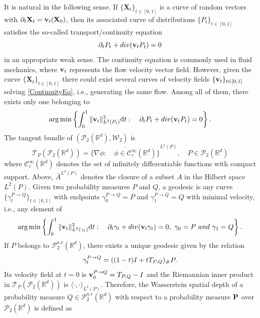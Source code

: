 \documentclass{imsart}
\numberwithin{equation}{section}
\def\R{\mathbb{R}}
\def\X{\mathbf{X}}
\DeclareMathOperator*{\argmin}{arg\,min}
\begin{document}
It is natural in the following sense. If $\{\X_t\}_{t\in [0,1]}$ is a curve of random vectors with $\partial_t \X_t={\bf v}_t(\X_0)$,  then its associated curve of distributions $\{P_t\}_{t\in [0,1]}$ satisfies the so-called transport/continuity equation 
\begin{equation}
	\label{ContinuityEq}
	\partial_t P_t+{\rm div}( {\bf v}_t P_t )=0
\end{equation}
in an appropriate weak sense. The continuity equation is commonly used in fluid mechanics, where  ${\bf v}_t$ represents the flow velocity vector field.    However, given the curve $\{\X_t\}_{t\in [0,1]}$ there could exist several curves of velocity fields $\{{\bf v}_t\}_{t\in [0,1]}$ solving \eqref{ContinuityEq}, i.e., generating the same flow. Among all  of them, there exists only one belonging to 
\begin{equation}
	\label{eq:WassersteinVar}
	\argmin\left\{\int_0^1 \|{\bf v}_t\|_{L^2(P_t)}^2 \mathrm{d} t:  \quad \partial_t P_t+{\rm div}( {\bf v}_t P_t )=0\right\}.
\end{equation}
The  tangent bundle of $(\mathcal{P}_2(\R^d), \mathcal{W}_2)$ is 
$$ \mathcal{T}_{P}(\mathcal{P}_2(\R^d))= \overline{\{ \nabla \phi: \quad \phi\in \mathcal{C}^{\infty}_c(\R^d)\}}^{L^2(P)}, \quad  P\in \mathcal{P}_2(\R^d) $$
where $\mathcal{C}^{\infty}_c(\R^d)$ denotes the set of infinitely differentiable functions with compact support.
Above, $\overline{A}^{L^2(P)}$ denotes the closure of a subset $A$ in the Hilbert space $L^2(P)$. 
Given two probability measures $P$ and $Q$, a geodesic is any curve $\{\gamma_{t}^{P\to Q}\}_{t\in [0,1]}$ with endpoints $\gamma_0^{P\to Q}=P$ and $\gamma_1^{P\to Q}=Q$ with minimal velocity, i.e., any element of 
\begin{equation}
	\label{eq:WassersteinVar2}
	\argmin \left\{\int_{0}^1 \|{\bf v}_t\|_{L^2(\gamma_t)}^2 \mathrm{d} t:  \quad \partial_t \gamma_t+{\rm div}( {\bf v}_t \gamma_t )=0, \ \gamma_0=P \ {\rm and}\ \gamma_1=Q\right\}.
\end{equation}
If $P$ belongs to $ \mathcal{P}^{a.c}_2(\R^d)$, there exists a unique geodesic given by the relation 
\begin{equation} \label{eq:unique:geodesic}
	\gamma_t^{P\to Q}= ( (1-t) {\rm I}+t T_{P,Q})_{\#} P.
\end{equation}  
Its velocity field at $t=0$ is 
$ {\bf v}_0^{P\to Q}= T_{P,Q}- {\rm I} $ and the Riemannian inner product in $ \mathcal{T}_{P}(\mathcal{P}_2(\R^d))$ is $\langle \cdot, \cdot\rangle_{L^2(P)}$.
Therefore, the Wasserstein spatial depth of a probability measure $Q\in \mathcal{P}_2^{a.c}(\R^d)$ with respect to a probability measure ${\bf P}$ over $\mathcal{P}_2(\R^d)$ is defined as 
\end{document}
